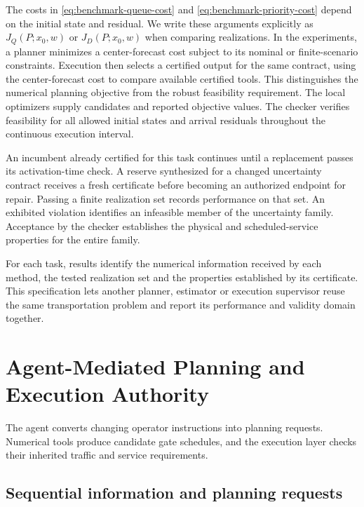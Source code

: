 \documentclass[preprint,12pt]{elsarticle}
\begin{document}
The costs in \eqref{eq:benchmark-queue-cost} and
\eqref{eq:benchmark-priority-cost} depend on the initial state and residual.
We write these arguments explicitly as $J_Q(P;x_0,w)$ or $J_D(P;x_0,w)$
when comparing realizations. In the experiments, a planner minimizes a
center-forecast cost subject to its nominal or finite-scenario constraints.
Execution then selects a certified output for the same contract, using
the center-forecast cost to compare available certified tools. This
distinguishes the numerical planning objective from the robust feasibility
requirement. The local optimizers supply candidates and reported objective
values. The checker verifies feasibility for all allowed initial states and arrival
residuals throughout the continuous execution interval.

An incumbent already certified for this task continues until a replacement
passes its activation-time check. A reserve synthesized for a changed
uncertainty contract receives a fresh certificate before becoming an
authorized endpoint for repair. Passing a finite realization set records
performance on that set. An exhibited violation identifies an infeasible
member of the uncertainty family. Acceptance by the checker establishes
the physical and scheduled-service properties for the entire family.

For each task, results identify the numerical information received by each
method, the tested realization set and the properties established by its
certificate. This specification lets another planner, estimator or execution
supervisor reuse the same transportation problem and report its performance
and validity domain together.

\section{Agent-Mediated Planning and Execution Authority}
\label{sec:new-agent}

The agent converts changing operator instructions into planning requests.
Numerical tools produce candidate gate schedules, and the execution layer
checks their inherited traffic and service requirements.

\subsection{Sequential information and planning requests}
\end{document}
